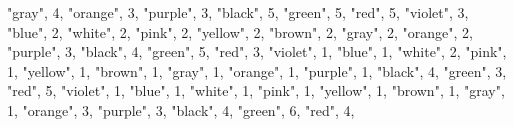 \documentclass[
]{article}
\newenvironment{Shaded}{\begin{snugshade}}{\end{snugshade}}
\newcommand{\DecValTok}[1]{\textcolor[rgb]{0.00,0.00,0.81}{#1}}
\newcommand{\NormalTok}[1]{#1}
\newcommand{\StringTok}[1]{\textcolor[rgb]{0.31,0.60,0.02}{#1}}
\begin{document}
\begin{Shaded}
\begin{Highlighting}[]
  \StringTok{"gray"}\NormalTok{, }\DecValTok{4}\NormalTok{,}
  \StringTok{"orange"}\NormalTok{, }\DecValTok{3}\NormalTok{,}
  \StringTok{"purple"}\NormalTok{, }\DecValTok{3}\NormalTok{,}
    \StringTok{"black"}\NormalTok{, }\DecValTok{5}\NormalTok{,}
  \StringTok{"green"}\NormalTok{, }\DecValTok{5}\NormalTok{,}
  \StringTok{"red"}\NormalTok{, }\DecValTok{5}\NormalTok{,}
  \StringTok{"violet"}\NormalTok{, }\DecValTok{3}\NormalTok{,}
  \StringTok{"blue"}\NormalTok{, }\DecValTok{2}\NormalTok{, }
  \StringTok{"white"}\NormalTok{, }\DecValTok{2}\NormalTok{,}
  \StringTok{"pink"}\NormalTok{, }\DecValTok{2}\NormalTok{,}
  \StringTok{"yellow"}\NormalTok{, }\DecValTok{2}\NormalTok{,}
  \StringTok{"brown"}\NormalTok{, }\DecValTok{2}\NormalTok{,}
  \StringTok{"gray"}\NormalTok{, }\DecValTok{2}\NormalTok{,}
  \StringTok{"orange"}\NormalTok{, }\DecValTok{2}\NormalTok{,}
  \StringTok{"purple"}\NormalTok{, }\DecValTok{3}\NormalTok{,}
    \StringTok{"black"}\NormalTok{, }\DecValTok{4}\NormalTok{,}
  \StringTok{"green"}\NormalTok{, }\DecValTok{5}\NormalTok{,}
  \StringTok{"red"}\NormalTok{, }\DecValTok{3}\NormalTok{,}
  \StringTok{"violet"}\NormalTok{, }\DecValTok{1}\NormalTok{,}
  \StringTok{"blue"}\NormalTok{, }\DecValTok{1}\NormalTok{,}
  \StringTok{"white"}\NormalTok{, }\DecValTok{2}\NormalTok{,}
  \StringTok{"pink"}\NormalTok{, }\DecValTok{1}\NormalTok{,}
  \StringTok{"yellow"}\NormalTok{, }\DecValTok{1}\NormalTok{,}
  \StringTok{"brown"}\NormalTok{, }\DecValTok{1}\NormalTok{,}
  \StringTok{"gray"}\NormalTok{, }\DecValTok{1}\NormalTok{,}
  \StringTok{"orange"}\NormalTok{, }\DecValTok{1}\NormalTok{,}
  \StringTok{"purple"}\NormalTok{, }\DecValTok{1}\NormalTok{,}
    \StringTok{"black"}\NormalTok{, }\DecValTok{4}\NormalTok{,}
  \StringTok{"green"}\NormalTok{, }\DecValTok{3}\NormalTok{,}
  \StringTok{"red"}\NormalTok{, }\DecValTok{5}\NormalTok{,}
  \StringTok{"violet"}\NormalTok{, }\DecValTok{1}\NormalTok{,}
  \StringTok{"blue"}\NormalTok{, }\DecValTok{1}\NormalTok{,}
  \StringTok{"white"}\NormalTok{, }\DecValTok{1}\NormalTok{,}
  \StringTok{"pink"}\NormalTok{, }\DecValTok{1}\NormalTok{,}
  \StringTok{"yellow"}\NormalTok{, }\DecValTok{1}\NormalTok{,}
  \StringTok{"brown"}\NormalTok{, }\DecValTok{1}\NormalTok{,}
  \StringTok{"gray"}\NormalTok{, }\DecValTok{1}\NormalTok{,}
  \StringTok{"orange"}\NormalTok{, }\DecValTok{3}\NormalTok{,}
  \StringTok{"purple"}\NormalTok{, }\DecValTok{3}\NormalTok{,}
    \StringTok{"black"}\NormalTok{, }\DecValTok{4}\NormalTok{,}
  \StringTok{"green"}\NormalTok{, }\DecValTok{6}\NormalTok{,}
  \StringTok{"red"}\NormalTok{, }\DecValTok{4}\NormalTok{, }

\end{Highlighting}
\end{Shaded}
\end{document}
